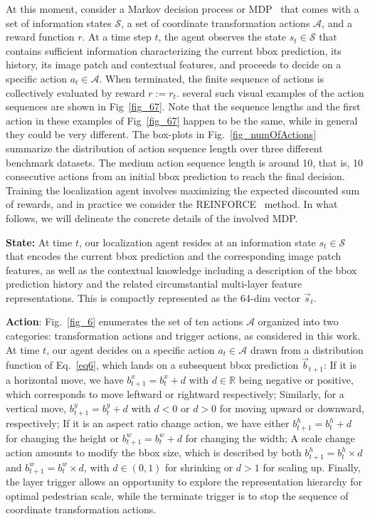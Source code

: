 \documentclass[10pt,journal,compsoc,twoside]{IEEEtran}
\begin{document}
At this moment, consider a Markov decision process or MDP~\cite{SutBar:book98} that comes with a set of information states $\mathcal{S}$, a set of coordinate transformation actions $\mathcal{A}$,
and a reward function $r$.
At a time step $t$, the agent observes the state $s_t \in \mathcal{S}$ that contains sufficient information characterizing the current bbox prediction, its history,
its image patch and contextual features, and proceeds to decide on a specific action $a_t \in \mathcal{A}$.
When terminated, the finite sequence of actions is collectively evaluated by reward $r:=r_t$.
several such visual examples of the action sequences are shown in Fig~\ref{fig_67}.
Note that the sequence lengths and the first action in these examples of Fig~\ref{fig_67} happen to be the same, while in general they could be very different.
The box-plots in Fig.~\ref{fig_numOfActions} summarize the distribution of action sequence length over three different benchmark datasets.
The medium action sequence length is around 10, that is, 10 consecutive actions from an initial bbox prediction to reach the final decision.
Training the localization agent involves maximizing the expected discounted sum of rewards, and in practice we consider the REINFORCE~\cite{Wil:mlj01} method.
In what follows, we will delineate the concrete details of the involved MDP.




\textbf{State:}
At time $t$, our localization agent resides at an information state $s_t \in \mathcal{S}$ that encodes the current bbox prediction and the corresponding image patch features,
as well as the contextual knowledge including a description of the bbox prediction history and the related circumstantial multi-layer feature representations. This is compactly represented as the 64-dim vector $\vec{s}_t$.



\textbf{Action}: Fig.~\ref{fig_6} enumerates the set of ten actions $\mathcal{A}$ organized into two categories:  transformation actions and trigger actions, as considered in this work.
At time $t$, our agent decides on a specific action $a_t \in \mathcal{A}$ drawn from a distribution function of Eq.~\eqref{eq6}, which lands on a subsequent bbox prediction $\vec{b}_{t+1}$:
If it is a horizontal move, we have $b^x_{t+1} = b^x_{t} + d$ with $d \in \mathbb{R}$ being negative or positive, which corresponds to move leftward or rightward respectively;
Similarly, for a vertical move, $b^y_{t+1} = b^y_{t} + d$ with $d<0$ or $d>0$ for moving upward or downward, respectively;
If it is an aspect ratio change action, we have either $b^h_{t+1} = b^h_{t} + d$ for changing the height or $b^w_{t+1} = b^w_{t} + d$ for changing the width;
A scale change action amounts to modify the bbox size,
which is described by both $b^h_{t+1} = b^h_{t} \times d$ and $b^w_{t+1} = b^w_{t} \times d$, with $d \in (0,1)$ for shrinking or $d>1$ for scaling up.
Finally, the layer trigger allows an opportunity to explore the representation hierarchy for optimal pedestrian scale,
while the terminate trigger is to stop the sequence of coordinate transformation actions.
\end{document}
